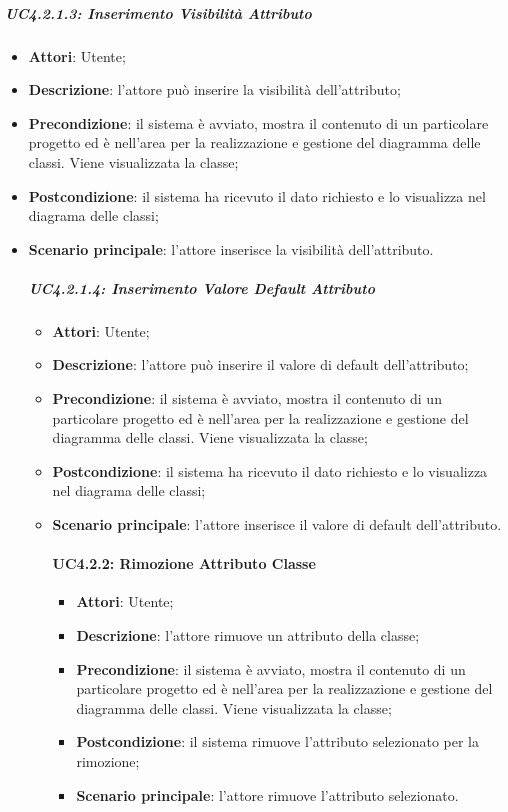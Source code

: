 \subparagraph{UC4.2.1.3: Inserimento Visibilità Attributo}
\label{UC4.2.1.3}
\begin{itemize}
	\item \textbf{Attori}: Utente;
	\item \textbf{Descrizione}: l'attore può inserire la visibilità dell'attributo;
	\item \textbf{Precondizione}: il sistema è avviato, mostra il contenuto di un particolare progetto ed è nell'area per la realizzazione e gestione del diagramma delle classi. Viene visualizzata la classe;
	\item \textbf{Postcondizione}: il sistema ha ricevuto il dato richiesto e lo visualizza nel diagrama delle classi;
	\item \textbf{Scenario principale}: l'attore inserisce la visibilità dell'attributo.

\subparagraph{UC4.2.1.4: Inserimento Valore Default Attributo}
\label{UC4.2.1.4}
\begin{itemize}
	\item \textbf{Attori}: Utente;
	\item \textbf{Descrizione}: l'attore può inserire il valore di default dell'attributo;
	\item \textbf{Precondizione}: il sistema è avviato, mostra il contenuto di un particolare progetto ed è nell'area per la realizzazione e gestione del diagramma delle classi. Viene visualizzata la classe;
	\item \textbf{Postcondizione}: il sistema ha ricevuto il dato richiesto e lo visualizza nel diagrama delle classi;
	\item \textbf{Scenario principale}: l'attore inserisce  il valore di default dell'attributo.

\paragraph{UC4.2.2: Rimozione Attributo Classe}
\label{UC4.2.2}
\begin{itemize}
	\item \textbf{Attori}: Utente;
	\item \textbf{Descrizione}: l'attore rimuove un attributo della classe;
	\item \textbf{Precondizione}: il sistema è avviato, mostra il contenuto di un particolare progetto ed è nell'area per la realizzazione e gestione del diagramma delle classi. Viene visualizzata la classe;
	\item \textbf{Postcondizione}: il sistema rimuove l'attributo selezionato per la rimozione;
	\item \textbf{Scenario principale}: l'attore rimuove l'attributo selezionato.
\end{itemize}


\end{itemize}
\end{itemize}
